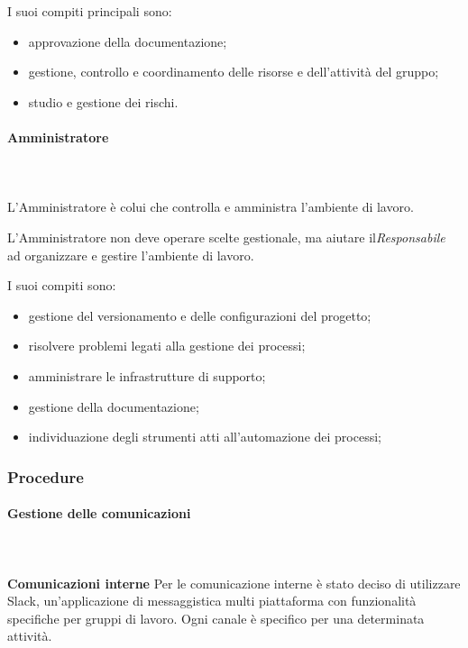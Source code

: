    			I suoi compiti principali sono:
   			\begin{itemize}
   				\item approvazione della documentazione;
   				\item gestione, controllo e coordinamento delle risorse e dell'attività del gruppo;
   				\item studio e gestione dei rischi.
   			\end{itemize}
   			\paragraph{Amministratore} \mbox{}\\ \mbox{}\\
   			L'Amministratore è colui che controlla e amministra l'ambiente di lavoro.
   			
   			L'Amministratore non deve operare scelte gestionale, ma aiutare il\textit{Responsabile} ad organizzare e gestire l'ambiente di lavoro.
   			
   			I suoi compiti sono:
   			\begin{itemize}
   				\item gestione del versionamento e delle configurazioni del progetto;
   				\item risolvere problemi legati alla gestione dei processi;
   				\item amministrare le infrastrutture di supporto;
   				\item gestione della documentazione;
   				\item individuazione degli strumenti atti all'automazione dei processi;
   			\end{itemize}
   		\subsubsection{Procedure}
   			\paragraph{Gestione delle comunicazioni}  \mbox{}\\ \mbox{}\\
   				\textbf{Comunicazioni interne}\newline \newline
   					Per le comunicazione interne è stato deciso di utilizzare  Slack\glos, un'applicazione di messaggistica multi piattaforma con funzionalità specifiche per gruppi di lavoro. Ogni canale è specifico per una determinata attività.
   				
